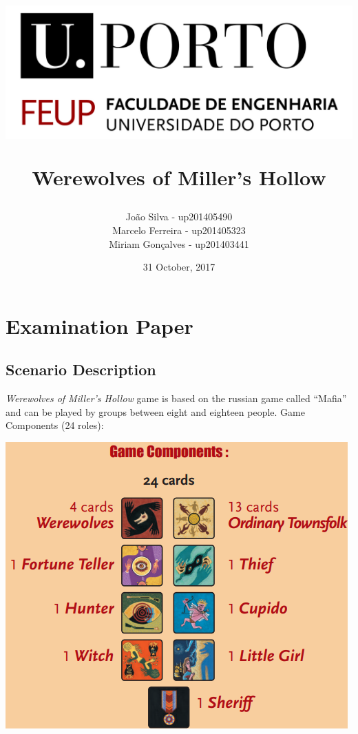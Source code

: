 \documentclass{article}
\title{ \begin{center}
					\includegraphics[scale=0.6]{FEUPlogo}
				\end{center}
				\textbf{Werewolves of Miller's Hollow}}
\author{João Silva - up201405490\\
		Marcelo Ferreira - up201405323\\
		Miriam Gonçalves - up201403441}
\date{31 October, 2017}
\begin{document}
\maketitle

\thispagestyle{empty}

\newpage

\tableofcontents

\newpage

\section{Examination Paper}
\subsection{Scenario Description}
\textit{Werewolves of Miller’s Hollow} game is based on the russian game called “Mafia” and can be played by groups between eight and eighteen people. 
Game Components (24 roles):
\begin{center}
	\includegraphics[scale=0.6]{gamecomponents}
\end{center}
	
\end{document}
